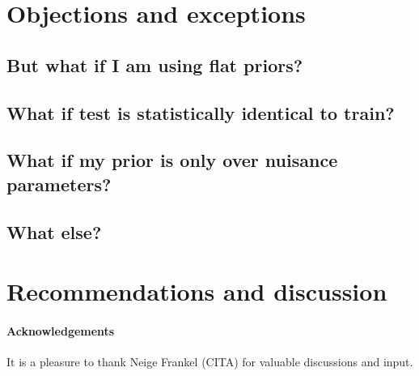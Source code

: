 \documentclass[10pt]{article}
\begin{document}
\section{Objections and exceptions}

\subsection{But what if I am using flat priors?}

\subsection{What if test is statistically identical to train?}

\subsection{What if my prior is only over nuisance parameters?}

\subsection{What else?}

\section{Recommendations and discussion}

\paragraph{Acknowledgements}
It is a pleasure to thank
  Neige Frankel (CITA)
for valuable discussions and input.


\raggedright

\end{document}
